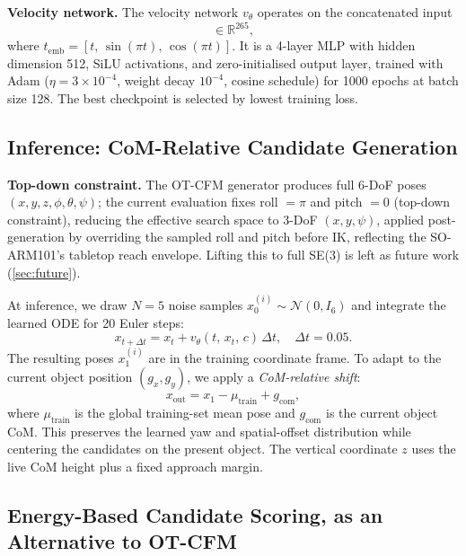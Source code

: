 \documentclass[journal]{IEEEtran}
\begin{document}
\noindent\textbf{Velocity network.}
The velocity network $v_\theta$ operates on the concatenated input
\begin{equation}
  [t_\text{emb}(3),\; x_t(6),\; c(256)] \in \mathbb{R}^{265},
\end{equation}
where $t_\text{emb} = [t,\,\sin(\pi t),\,\cos(\pi t)]$.
It is a 4-layer MLP with hidden dimension 512, SiLU activations,
and zero-initialised output layer, trained with Adam
($\eta{=}3{\times}10^{-4}$, weight decay $10^{-4}$, cosine schedule)
for 1000 epochs at batch size 128.
The best checkpoint is selected by lowest training loss.

\subsection{Inference: CoM-Relative Candidate Generation}
\label{sec:inference}

\noindent\textbf{Top-down constraint.}
The OT-CFM generator produces full 6-DoF poses
$(x, y, z, \phi, \theta, \psi)$; the current evaluation fixes roll $=\pi$
and pitch $=0$ (top-down constraint), reducing the effective search space to
3-DoF $(x,y,\psi)$, applied post-generation by overriding the sampled roll
and pitch before IK, reflecting the SO-ARM101's tabletop reach envelope.
Lifting this to full SE(3) is left as future work (\cref{sec:future}).

At inference, we draw $N{=}5$ noise samples $x_0^{(i)} \sim \mathcal{N}(0, I_6)$
and integrate the learned ODE for 20 Euler steps:
\begin{equation}
  x_{t+\Delta t} = x_t + v_\theta(t,\, x_t,\, c)\,\Delta t,
  \quad \Delta t = 0.05.
\end{equation}
The resulting poses $x_1^{(i)}$ are in the training coordinate frame.
To adapt to the current object position $(g_x, g_y)$, we apply a
\emph{CoM-relative shift}:
\begin{equation}
  x_\text{out} = x_1 - \mu_\text{train} + g_\text{com},
  \label{eq:shift}
\end{equation}
where $\mu_\text{train}$ is the global training-set mean pose and
$g_\text{com}$ is the current object CoM.
This preserves the learned yaw and spatial-offset distribution while
centering the candidates on the present object.
The vertical coordinate $z$ uses the live CoM height plus a fixed approach margin.

\subsection{Energy-Based Candidate Scoring, as an Alternative to OT-CFM}
\label{sec:ebm}
\end{document}
